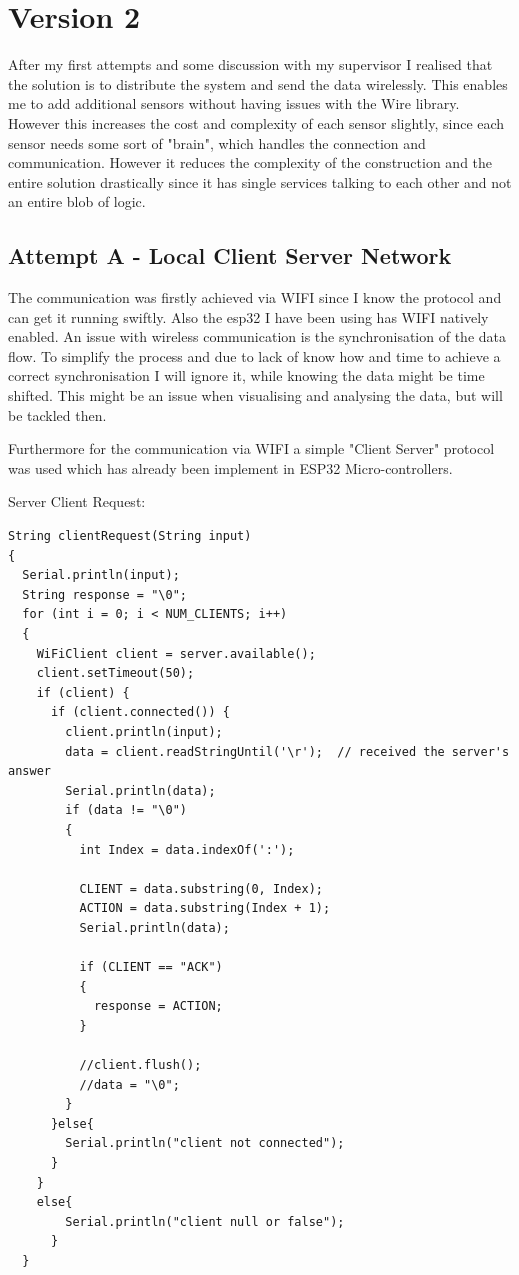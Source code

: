 \chapter*{Version 2}
\label{chap:Technical CHallenges}
\renewcommand{\thesection}{\arabic{section}}
\setcounter{section}{0}

After my first attempts and some discussion with my supervisor I realised that the solution is to distribute the system and send the data wirelessly. This enables me to add additional sensors without having issues with the Wire library. However this increases the cost and complexity of each sensor slightly, since each sensor needs some sort of "brain", which handles the connection and communication. 
However it reduces the complexity of the construction and the entire solution drastically since it has single services talking to each other and not an entire blob of logic. 

\section{Attempt A - Local Client Server Network}

The communication was firstly achieved via WIFI since I know the protocol and can get it running swiftly. Also the esp32 I have been using has WIFI natively enabled. 
An issue with wireless communication is the synchronisation of the data flow. To simplify the process and due to lack of know how and time to achieve a correct synchronisation I will ignore it, while knowing the data might be time shifted. 
This might be an issue when visualising and analysing the data, but will be tackled then.

Furthermore for the communication via WIFI a simple "Client Server" protocol was used which has already been implement in ESP32 Micro-controllers.\cite{arduinoi4:online} \cite{ESP32Ser71:online}

Server Client Request: 
\begin{lstlisting}
String clientRequest(String input)
{
  Serial.println(input);
  String response = "\0";
  for (int i = 0; i < NUM_CLIENTS; i++)
  {
    WiFiClient client = server.available();
    client.setTimeout(50);
    if (client) {
      if (client.connected()) {
        client.println(input);
        data = client.readStringUntil('\r');  // received the server's answer
        Serial.println(data);
        if (data != "\0")
        {
          int Index = data.indexOf(':');
        
          CLIENT = data.substring(0, Index);
          ACTION = data.substring(Index + 1);
          Serial.println(data);
   
          if (CLIENT == "ACK")
          {
            response = ACTION;
          }

          //client.flush();
          //data = "\0";
        }
      }else{
        Serial.println("client not connected");
      }
    }
    else{
        Serial.println("client null or false");
      }
  }
\end{lstlisting}
\cite{ESP32Ser71:online}

